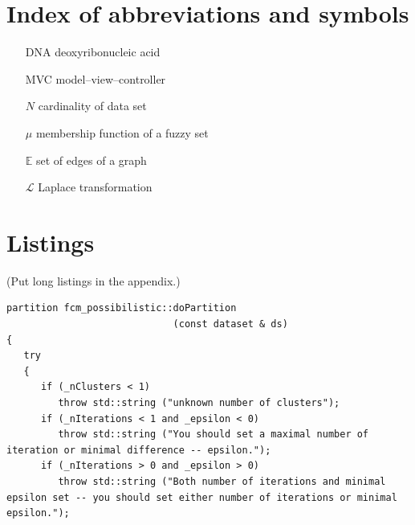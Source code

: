 \documentclass[a4paper,twoside,12pt]{book}
\newcounter{PagesWithoutNumbers}
\begin{document}
 

 


\backmatter
{}
\setcounter{page}{\value{PagesWithoutNumbers}}

\pagestyle{onlyPageNumbers}

\printbibliography           %



\begin{appendices} 


 

\chapter*{Index of abbreviations and symbols}

\begin{itemize}
\item[DNA] deoxyribonucleic acid
\item[MVC] model--view--controller 
\item[$N$] cardinality of data set
\item[$\mu$] membership function of a fuzzy set
\item[$\mathbb{E}$] set of edges of a graph
\item[$\mathcal{L}$] Laplace transformation
\end{itemize}


\chapter*{Listings}

(Put long listings in the appendix.)

\begin{lstlisting}
partition fcm_possibilistic::doPartition
                             (const dataset & ds)
{
   try
   {
      if (_nClusters < 1)
         throw std::string ("unknown number of clusters");
      if (_nIterations < 1 and _epsilon < 0)
         throw std::string ("You should set a maximal number of iteration or minimal difference -- epsilon.");
      if (_nIterations > 0 and _epsilon > 0)
         throw std::string ("Both number of iterations and minimal epsilon set -- you should set either number of iterations or minimal epsilon.");
   

\end{lstlisting}
\end{appendices}
\end{document}
